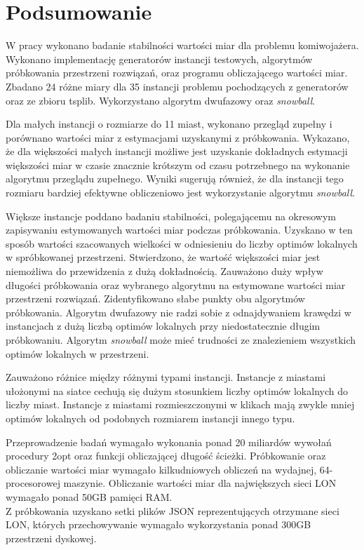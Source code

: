 \chapter{Podsumowanie}

W pracy wykonano badanie stabilności wartości miar dla problemu komiwojażera.
Wykonano implementację generatorów instancji testowych, algorytmów próbkowania przestrzeni rozwiązań,
oraz programu obliczającego wartości miar.
Zbadano 24 różne miary dla 35 instancji problemu pochodzących z generatorów oraz ze zbioru tsplib.
Wykorzystano algorytm dwufazowy oraz \textit{snowball}.

Dla małych instancji o rozmiarze do 11 miast, wykonano przegląd zupełny i porównano wartości miar z estymacjami uzyskanymi
z próbkowania. Wykazano, że dla większości małych instancji możliwe jest uzyskanie dokładnych estymacji
większości miar w czasie znacznie krótszym od czasu potrzebnego na wykonanie algorytmu przeglądu zupełnego.
Wyniki sugerują również, że dla instancji tego rozmiaru bardziej efektywne obliczeniowo jest wykorzystanie
algorytmu \textit{snowball}.

Większe instancje poddano badaniu stabilności, polegającemu na okresowym zapisywaniu estymowanych wartości miar
podczas próbkowania. Uzyskano w ten sposób wartości szacowanych wielkości w odniesieniu do liczby optimów lokalnych w spróbkowanej przestrzeni.
Stwierdzono, że wartość większości miar jest niemożliwa do przewidzenia z dużą dokładnością.
Zauważono duży wpływ długości próbkowania oraz wybranego algorytmu na estymowane wartości miar przestrzeni rozwiązań.
Zidentyfikowano słabe punkty obu algorytmów próbkowania.
Algorytm dwufazowy nie radzi sobie z odnajdywaniem krawędzi w instancjach z dużą liczbą optimów lokalnych przy niedostatecznie długim próbkowaniu.
Algorytm \textit{snowball} może mieć trudności ze znalezieniem wszystkich optimów lokalnych w przestrzeni.

Zauważono różnice między różnymi typami instancji.
Instancje z miastami ułożonymi na siatce cechują się dużym stosunkiem liczby optimów lokalnych do liczby miast.
Instancje z miastami rozmieszczonymi w klikach mają zwykle mniej optimów lokalnych od podobnych rozmiarem instancji innego typu.

Przeprowadzenie badań wymagało wykonania ponad 20 miliardów wywołań procedury 2opt oraz funkcji obliczającej długość ścieżki.
Próbkowanie oraz obliczanie wartości miar wymagało kilkudniowych obliczeń
na wydajnej, 64-procesorowej maszynie. Obliczanie wartości miar dla największych sieci LON wymagało ponad 50GB pamięci RAM. \\
Z próbkowania uzyskano setki plików JSON reprezentujących otrzymane sieci LON, których przechowywanie wymagało wykorzystania ponad 300GB przestrzeni dyskowej.

